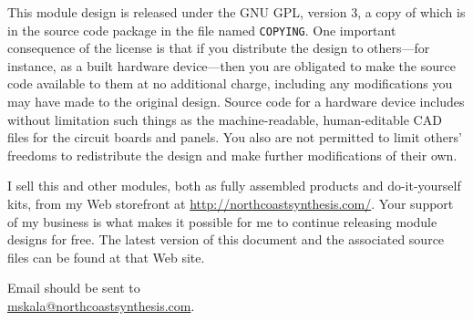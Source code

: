 This module design is released under the GNU GPL, version 3, a copy of which
is in the source code package in the file named \texttt{COPYING}.  One
important consequence of the license is that if you distribute the design to
others---for instance, as a built hardware device---then you are obligated
to make the source code available to them at no additional charge, including
any modifications you may have made to the original design.  Source code for
a hardware device includes without limitation such things as the
machine-readable, human-editable CAD files for the circuit boards and
panels.  You also are not permitted to limit others' freedoms to
redistribute the design and make further modifications of their own.

I sell this and other modules, both as fully assembled products and
do-it-yourself kits, from my Web storefront at
\url{http://northcoastsynthesis.com/}.  Your support of my business is what
makes it possible for me to continue releasing module designs for free. 
The latest version of this document and the associated source files can be
found at that Web site.

Email should be sent to\\ \url{mskala@northcoastsynthesis.com}.
